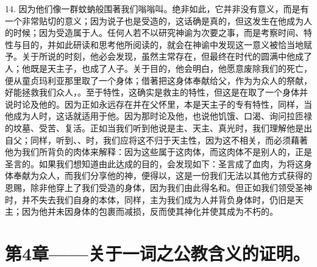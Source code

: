 14. 因为他们像一群蚊蚋般围著我们嗡嗡叫。绝非如此，它并非没有意义，而是有一个非常贴切的意义；因为说子也是受造的，这话确是真的，但这发生在他成为人的时候；因为受造属于人。任何人若不以研究神谕为次要之事，而是考察时间、特性与目的，并如此研读和思考他所阅读的，就会在神谕中发现这一意义被恰当地赋予。关于所说的时刻，他必会发现，虽然主常存在，但最终在时代的圆满中他成了人；他既是天主子，也成了人子。关于目的，他会明白，他愿意废除我们的死亡，便从童贞玛利亚那里取了一个身体；借著把这身体奉献给父，作为为众人的祭献，好能拯救我们众人，。至于特性，这确实是救主的特性，但这是在取了一个身体并说时论及他的。因为正如永远存在并在父怀里，本是天主子的专有特性，同样，当他成为人时，这话就适用于他。因为那时论及他，也说他饥饿、口渴、询问拉匝禄的坟墓、受苦、复活。正如当我们听到他说是主、天主、真光时，我们理解他是出自父；同样，听到、、时，我们应将这不归于天主性，因为这不相关，而必须藉著他为我们所背负的肉体来解释：因为这些属于这肉体，而这肉体不是别人的，正是圣言的。如果我们想知道由此达成的目的，会发现如下：圣言成了血肉，为将这身体奉献为众人，而我们分享他的神，便得以，这是一份我们无法以其他方式获得的恩赐，除非他穿上了我们受造的身体，因为我们由此得名和。但正如我们领受圣神时，并不失去我们自身的本体，同样，主为我们成为人并背负身体时，仍旧是天主；因为他并未因身体的包裹而减损，反而使其神化并使其成为不朽的。\par


\section{第4章——关于一词之公教含义的证明。}

